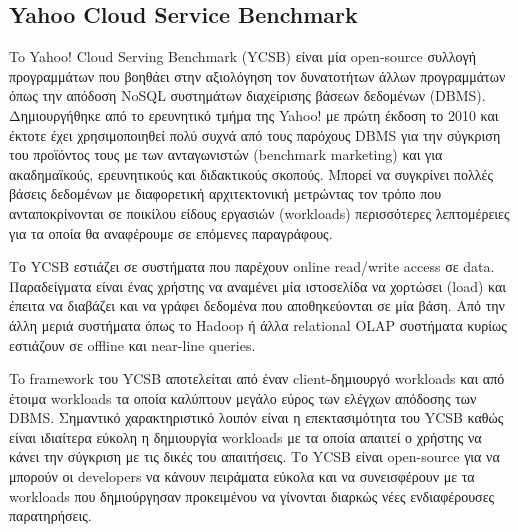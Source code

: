 \documentclass[conference]{IEEEtran}
\begin{document}
\subsection{Yahoo Cloud Service Benchmark}
        To Yahoo! Cloud Serving Benchmark (YCSB) είναι μία open-source συλλογή προγραμμάτων που βοηθάει στην αξιολόγηση τον δυνατοτήτων άλλων προγραμμάτων όπως την απόδοση NoSQL συστημάτων διαχείρισης βάσεων δεδομένων (DBMS). Δημιουργήθηκε από το ερευνητικό τμήμα της Yahoo! με πρώτη έκδοση το 2010 και έκτοτε έχει χρησιμοποιηθεί πολύ συχνά από τους παρόχους DBMS για την σύγκριση του προϊόντος τους με των ανταγωνιστών (benchmark marketing) και για ακαδημαϊκούς, ερευνητικούς και διδακτικούς σκοπούς. Μπορεί να συγκρίνει πολλές βάσεις δεδομένων με διαφορετική αρχιτεκτονική μετρώντας τον τρόπο που ανταποκρίνονται σε ποικίλου είδους εργασιών (workloads) περισσότερες λεπτομέρειες για τα οποία θα αναφέρουμε σε επόμενες παραγράφους.
       
        Το YCSB εστιάζει σε συστήματα που παρέχουν online read/write access σε data. Παραδείγματα είναι ένας χρήστης να αναμένει μία ιστοσελίδα να χορτώσει (load) και έπειτα να διαβάζει και να γράφει δεδομένα που αποθηκεύονται σε μία βάση. Από την άλλη μεριά συστήματα όπως το Hadoop ή  άλλα relational OLAP συστήματα κυρίως εστιάζουν σε offline και near-line queries.
	   
        To framework του YCSB αποτελείται από έναν client-δημιουργό workloads και από έτοιμα workloads τα οποία καλύπτουν μεγάλο εύρος των ελέγχων απόδοσης των DBMS. Σημαντικό χαρακτηριστικό λοιπόν είναι η επεκτασιμότητα του YCSB καθώς είναι ιδιαίτερα εύκολη η δημιουργία workloads με τα οποία απαιτεί ο χρήστης να κάνει την σύγκριση με τις δικές του απαιτήσεις. Το YCSB είναι open-source για να μπορούν οι developers να κάνουν πειράματα εύκολα και να συνεισφέρουν με τα workloads που δημιούργησαν προκειμένου να γίνονται διαρκώς νέες ενδιαφέρουσες παρατηρήσεις.
\end{document}
